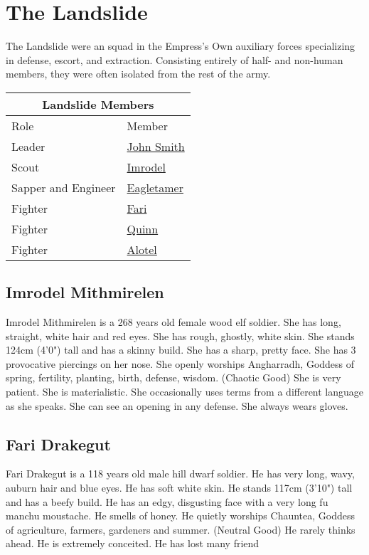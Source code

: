 \section{The Landslide}

The Landslide were an squad in the Empress's Own auxiliary forces specializing in defense, escort,
  and extraction.
Consisting entirely of half- and non-human members, they were often isolated from the rest of the
  army.

\bigskip
\begin{center}
  \begin{tabular}{|l|l|}
    \hline
    \multicolumn{2}{|c|}{Landslide Members}\\
    \hline
    Role & Member \\
    \hline
    Leader & \hyperref[sec:beez]{John Smith} \\
    Scout & \hyperref[subsec:imrodel]{Imrodel} \\
    Sapper and Engineer & \hyperref[subsec:eagletamer]{Eagletamer} \\
    Fighter & \hyperref[subsec:fari]{Fari} \\
    Fighter & \hyperref[subsec:quinn]{Quinn} \\
    Fighter & \hyperref[subsec:alotel]{Alotel} \\
    \hline
  \end{tabular}
\end{center}


\subsection{Imrodel Mithmirelen}\label{subsec:imrodel}
Imrodel Mithmirelen is a 268 years old female wood elf soldier.
She has long, straight, white hair and red eyes.
She has rough, ghostly, white skin.
She stands 124cm (4'0") tall and has a skinny build.
She has a sharp, pretty face.
She has 3 provocative piercings on her nose.
She openly worships Angharradh, Goddess of spring, fertility, planting, birth, defense, wisdom. (Chaotic Good)
She is very patient.
She is materialistic.
She occasionally uses terms from a different language as she speaks.
She can see an opening in any defense.
She always wears gloves.

\subsection{Fari Drakegut}\label{subsec:fari}
Fari Drakegut is a 118 years old male hill dwarf soldier.
He has very long, wavy, auburn hair and blue eyes.
He has soft white skin.
He stands 117cm (3'10") tall and has a beefy build.
He has an edgy, disgusting face with a very long fu manchu moustache.
He smells of honey.
He quietly worships Chauntea, Goddess of agriculture, farmers, gardeners and summer. (Neutral Good)
He rarely thinks ahead.
He is extremely conceited.
He has lost many friend


